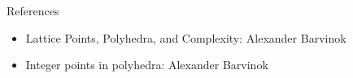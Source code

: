 \documentclass[presentation]{beamer}
\begin{document}
\begin{frame}[label=sec-6]{References}
\begin{itemize}
\item Lattice Points, Polyhedra, and Complexity: Alexander Barvinok
\item Integer points in polyhedra: Alexander Barvinok
\end{itemize}
\end{frame}
\end{document}
